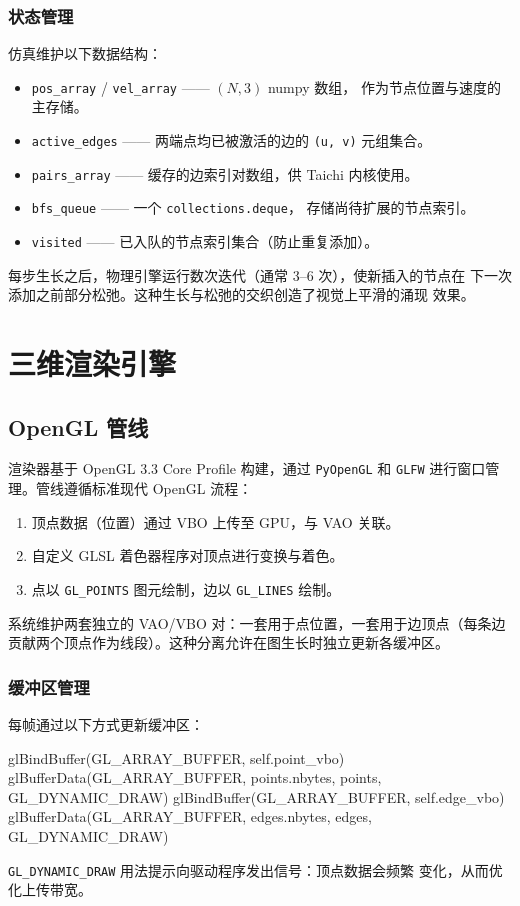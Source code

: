 \documentclass[11pt,a4paper]{report}
\begin{document}
\subsection{状态管理}
\label{sec:bfs-state}
仿真维护以下数据结构：
\begin{itemize}
    \item \lstinline{pos_array} / \lstinline{vel_array} —— $(N,3)$ numpy 数组，
          作为节点位置与速度的主存储。
    \item \lstinline{active_edges} —— 两端点均已被激活的边的
          \lstinline{(u, v)} 元组集合。
    \item \lstinline{pairs_array} —— 缓存的边索引对数组，供 Taichi 内核使用。
    \item \lstinline{bfs_queue} —— 一个 \lstinline{collections.deque}，
          存储尚待扩展的节点索引。
    \item \lstinline{visited} —— 已入队的节点索引集合（防止重复添加）。
\end{itemize}
每步生长之后，物理引擎运行数次迭代（通常 3--6 次），使新插入的节点在
下一次添加之前部分松弛。这种生长与松弛的交织创造了视觉上平滑的涌现
效果。
\chapter{三维渲染引擎}
\label{ch:rendering}
\section{OpenGL 管线}
\label{sec:opengl-pipeline}
渲染器基于 OpenGL 3.3 Core Profile 构建，通过 \texttt{PyOpenGL} 和
\texttt{GLFW} 进行窗口管理。管线遵循标准现代 OpenGL 流程：
\begin{enumerate}
    \item 顶点数据（位置）通过 VBO 上传至 GPU，与 VAO 关联。
    \item 自定义 GLSL 着色器程序对顶点进行变换与着色。
    \item 点以 \lstinline{GL_POINTS} 图元绘制，边以
          \lstinline{GL_LINES} 绘制。
\end{enumerate}
系统维护两套独立的 VAO/VBO 对：一套用于点位置，一套用于边顶点（每条边
贡献两个顶点作为线段）。这种分离允许在图生长时独立更新各缓冲区。
\subsection{缓冲区管理}
\label{sec:buffers}
每帧通过以下方式更新缓冲区：
\begin{pythoncode}
glBindBuffer(GL_ARRAY_BUFFER, self.point_vbo)
glBufferData(GL_ARRAY_BUFFER, points.nbytes, points, GL_DYNAMIC_DRAW)
glBindBuffer(GL_ARRAY_BUFFER, self.edge_vbo)
glBufferData(GL_ARRAY_BUFFER, edges.nbytes, edges, GL_DYNAMIC_DRAW)
\end{pythoncode}
\lstinline{GL_DYNAMIC_DRAW} 用法提示向驱动程序发出信号：顶点数据会频繁
变化，从而优化上传带宽。
\end{document}
